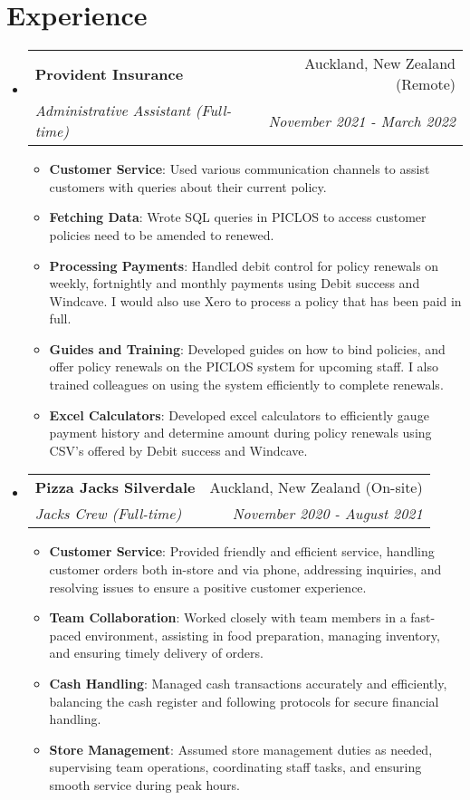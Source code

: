 \documentclass[a4paper,20pt]{article}
\makeatletter
\newcommand{\resumeItem}[2]{
  \item\small{
    \textbf{#1}{: #2 \vspace{-2pt}}
  }
}
\newcommand{\resumeSubheading}[4]{
  \vspace{-1pt}\item
    \begin{tabular*}{0.97\textwidth}{l@{\extracolsep{\fill}}r}
      \textbf{#1} & #2 \\
      \textit{#3} & \textit{#4} \\
    \end{tabular*}\vspace{-5pt}
}
\newcommand{\resumeSubHeadingListStart}{\begin{itemize}[leftmargin=*]}
\newcommand{\resumeSubHeadingListEnd}{\end{itemize}}
\newcommand{\resumeItemListStart}{\begin{itemize}}
\newcommand{\resumeItemListEnd}{\end{itemize}\vspace{-5pt}}
\makeatother
\begin{document}
\vspace{-5pt}
\section{Experience}
  \resumeSubHeadingListStart
    \resumeSubheading{Provident Insurance}{Auckland, New Zealand (Remote)}
    {Administrative Assistant (Full-time)}{November 2021 - March 2022}
        \resumeItemListStart
              \resumeItem{Customer Service}
              {Used various communication channels to assist customers with queries about their current policy.}
              \resumeItem{Fetching Data}
              {Wrote SQL queries in PICLOS to access customer policies need to be amended to renewed.}
              \resumeItem{Processing Payments}{Handled debit control for policy renewals on weekly, fortnightly and monthly payments using Debit success and Windcave. I would also use Xero to process a policy that has been paid in full.}
              \resumeItem{Guides and Training}{Developed guides on how to bind policies,  and offer policy renewals on the PICLOS system for upcoming staff. I also trained colleagues on using the system efficiently to complete renewals. }
              \resumeItem{Excel Calculators}{Developed excel calculators to efficiently gauge payment history and determine amount during policy renewals using CSV's offered by Debit success and Windcave. }
          \resumeItemListEnd
    \resumeSubheading{Pizza Jacks Silverdale}{Auckland, New Zealand (On-site)}
    {Jacks Crew (Full-time)}{November 2020 - August 2021}
        \resumeItemListStart
               \resumeItem{Customer Service}
              {Provided friendly and efficient service, handling customer orders both in-store and via phone, addressing inquiries, and resolving issues to ensure a positive customer experience.}
              \resumeItem{Team Collaboration}
              {Worked closely with team members in a fast-paced environment, assisting in food preparation, managing inventory, and ensuring timely delivery of orders.}
              \resumeItem{Cash Handling}
              {Managed cash transactions accurately and efficiently, balancing the cash register and following protocols for secure financial handling.}
              \resumeItem{Store Management}
              {Assumed store management duties as needed, supervising team operations, coordinating staff tasks, and ensuring smooth service during peak hours.}
          \resumeItemListEnd
        \resumeSubHeadingListEnd
\vspace{-5pt}
\end{document}
